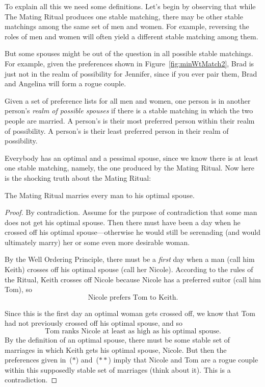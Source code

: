 To explain all this we need some definitions.  Let's begin by
observing that while The Mating Ritual produces one stable matching,
there may be other stable matchings among the same set of men and
women.  For example, reversing the roles of men and women will often
yield a different stable matching among them.

But some spouses might be out of the question in all possible stable
matchings.  For example, given the preferences shown in
Figure~\ref{fig:minWtMatch2}, Brad is just not in the realm of
possibility for Jennifer, since if you ever pair them, Brad and
Angelina will form a rogue couple.

\begin{definition}
Given a set of preference lists for all men and women, one person is
in another person's \emph{realm of possible spouses} if there is a
stable matching in which the two people are married.  A person's
 is their most preferred person within their
realm of possibility.  A person's  is their
least preferred person in their realm of possibility.
\end{definition}

Everybody has an optimal and a pessimal spouse, since we know there is at
least one stable matching, namely, the one produced by the Mating Ritual.
Now here is the shocking truth about the Mating Ritual:

\begin{theorem}\label{boyopt}
The Mating Ritual marries every man to his optimal spouse.
\end{theorem}

\begin{proof}
By contradiction.  Assume for the purpose of contradiction that some
man does not get his optimal spouse.  Then there must have been a day
when he crossed off his optimal spouse---otherwise he would still be
serenading (and would ultimately marry) her or some even more
desirable woman.

By the Well Ordering Principle, there must be a \emph{first} day when
a man (call him Keith) crosses off his optimal spouse (call her
Nicole).
According to the rules of the Ritual, Keith crosses off Nicole because
Nicole has a preferred suitor (call him Tom), so
\begin{equation}
\text{Nicole prefers Tom to Keith.} \tag{$*$}
\end{equation}

Since this is the first day an optimal woman gets crossed off, we know
that Tom had not previously crossed off his optimal spouse, and so
\begin{equation}\tag{$**$}
\text{Tom ranks Nicole at least as high as his optimal spouse.}
\end{equation}
By the definition of an optimal spouse, there must be some stable set
of marriages in which Keith gets his optimal spouse, Nicole.  But then
the preferences given in~($*$) and~($**$) imply that Nicole and Tom
are a rogue couple within this supposedly stable set of marriages
(think about it).  This is a contradiction.
\end{proof}

